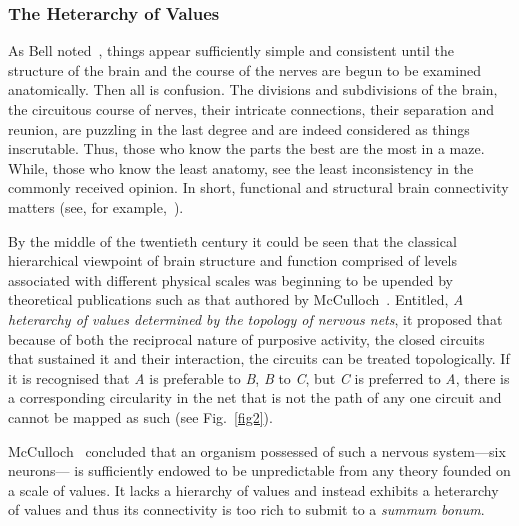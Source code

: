 \documentclass[10pt,letterpaper]{article}
\begin{document}
\subsubsection*{The Heterarchy of Values}

As Bell noted~\cite{bell11}, things appear sufficiently simple and consistent until the structure of the brain and the course of the nerves are begun to be examined anatomically. Then all is confusion. The divisions and subdivisions of the brain, the circuitous course of nerves, their intricate connections, their separation and reunion, are puzzling in the last degree and are indeed considered as things inscrutable. Thus, those who know the parts the best are the most in a maze. While, those who know the least anatomy, see the least inconsistency in the commonly received opinion. In short, functional and structural brain connectivity matters (see, for example,~\cite{gili18}).

By the middle of the twentieth century it could be seen that the classical hierarchical viewpoint of brain structure and function comprised of levels associated with different physical scales was beginning to be upended by theoretical publications such as that authored by McCulloch~\cite{mcculloch45a}. Entitled, {\it{A heterarchy of values determined by the topology of nervous nets}}, it proposed that because of both the reciprocal nature of purposive activity, the closed circuits that sustained it and their interaction, the circuits can be treated topologically. If it is recognised that {\it{A}} is preferable to {\it{B}}, {\it{B}} to {\it{C}}, but {\it{C}} is preferred to {\it{A}}, there is a  corresponding circularity in the net that is not the path of any one circuit and cannot be mapped as such (see Fig.~\ref{fig2}).

McCulloch~\cite{mcculloch45a} concluded that an organism possessed of such a nervous system---six neurons--- is sufficiently endowed to be unpredictable from any theory founded on a scale of values. It lacks a hierarchy of values and instead exhibits a heterarchy of values and thus its connectivity is too rich to submit to a {\it{summum bonum}}.
\end{document}
